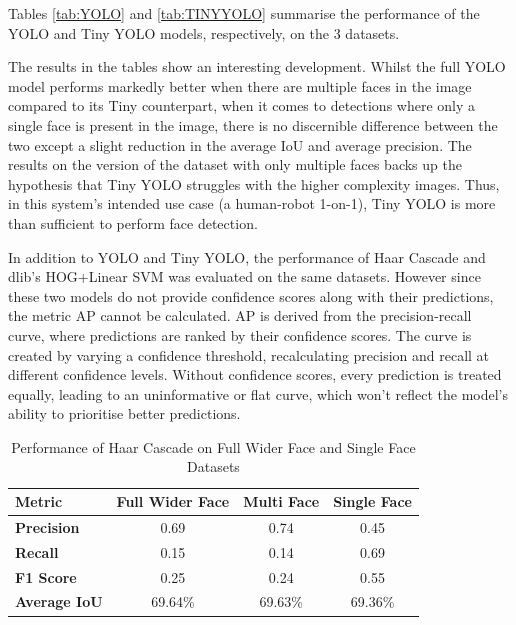 Tables \ref{tab:YOLO} and \ref{tab:TINYYOLO} summarise the performance of the YOLO and Tiny YOLO models, respectively, on the 3 datasets.

The results in the tables show an interesting development. Whilst the full YOLO model performs markedly better when there are multiple faces in the image compared to its Tiny counterpart, when it comes to detections where only a single face is present in the image, there is no discernible difference between the two except a slight reduction in the average IoU and average precision. The results on the version of the dataset with only multiple faces backs up the hypothesis that Tiny YOLO struggles with the higher complexity images. Thus, in this system's intended use case (a human-robot 1-on-1), Tiny YOLO is more than sufficient to perform face detection.

In addition to YOLO and Tiny YOLO, the performance of Haar Cascade and dlib's HOG+Linear SVM was evaluated on the same datasets. However since these two models do not provide confidence scores along with their predictions, the metric AP cannot be calculated. AP is derived from the precision-recall curve, where predictions are ranked by their confidence scores. The curve is created by varying a confidence threshold, recalculating precision and recall at different confidence levels. Without confidence scores, every prediction is treated equally, leading to an uninformative or flat curve, which won't reflect the model's ability to prioritise better predictions.

\begin{table}[h!]
\centering{}
\caption{Performance of Haar Cascade on Full Wider Face and Single Face Datasets}
\begin{tabular}{|l|c|c|c|}
\hline
\textbf{Metric}      & \textbf{Full Wider Face} & \textbf{Multi Face}  & \textbf{Single Face} \\ \hline
\textbf{Precision}   & 0.69      &  0.74           & 0.45               \\ \hline
\textbf{Recall}      & 0.15      &  0.14           & 0.69               \\ \hline
\textbf{F1 Score}    & 0.25      &  0.24           & 0.55               \\ \hline
\textbf{Average IoU} & 69.64\%     &  69.63\%           & 69.36\%              \\ \hline
\end{tabular}
\label{tab:HAAR}
\end{table}

